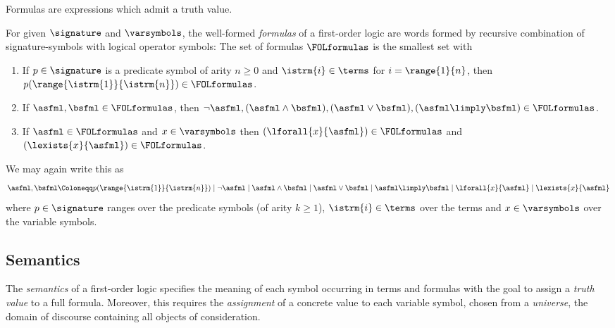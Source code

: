             Formulas are expressions which admit a truth value.
            \begin{definition}
                For given $\signature$ and $\varsymbols$, the well-formed \emph{formulas} of a first-order logic are words formed by recursive combination of signature-symbols with logical operator symbols:
                The set of formulas $\FOLformulas$ is the smallest set with
                \begin{enumerate}
                    \item If $p\in\signature$ is a predicate symbol of arity $n\geq 0$ and $\istrm{i}\in\terms$ for $i=\range{1}{n}$, then $p(\range{\istrm{1}}{\istrm{n}})\in\FOLformulas$.
                    \item If $\asfml,\bsfml\in\FOLformulas$, then $\lnot\asfml,(\asfml\land\bsfml),(\asfml\lor\bsfml),(\asfml\limply\bsfml)\in\FOLformulas$.
                    \item If $\asfml\in\FOLformulas$ and $x\in\varsymbols$ then $(\lforall{x}{\asfml})\in\FOLformulas$ and  $(\lexists{x}{\asfml})\in\FOLformulas$.
                \end{enumerate}
                We may again write this as
                \begin{equation}
                    \asfml,\bsfml \Coloneqq
                        p(\range{\istrm{1}}{\istrm{n}}) \mid
                        \lnot\asfml \mid
                        \asfml\land\bsfml \mid
                        \asfml\lor\bsfml \mid
                        \asfml\limply\bsfml \mid
                        \lforall{x}{\asfml} \mid
                        \lexists{x}{\asfml}
                \end{equation}
                where $p\in\signature$ ranges over the predicate symbols (of arity $k\geq 1$), $\istrm{i}\in\terms$ over the terms and $x\in\varsymbols$ over the variable symbols.
            \end{definition}

        \subsection{Semantics}
            \label{sec:FOL-semantics}
            
            The \emph{semantics} of a first-order logic specifies the meaning of each symbol occurring in terms and formulas with the goal to assign a \emph{truth value} to a full formula.
            Moreover, this requires the \emph{assignment} of a concrete value to each variable symbol, chosen from a \emph{universe}, the domain of discourse containing all objects of consideration.

